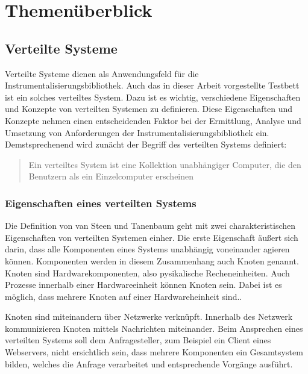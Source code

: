 %

\chapter{Themenüberblick}

\section{Verteilte Systeme}

Verteilte Systeme dienen als Anwendungsfeld für die Instrumentalisierungsbibliothek. Auch das in dieser Arbeit vorgestellte Testbett ist ein solches verteiltes System. Dazu ist es wichtig,  verschiedene Eigenschaften und Konzepte von verteilten Systemen zu definieren. Diese Eigenschaften und Konzepte nehmen einen entscheidenden Faktor bei der Ermittlung, Analyse und Umsetzung von Anforderungen der Instrumentalisierungsbibliothek ein. Demstsprechenend wird zunächt der Begriff des verteilten Systems definiert:

\begin{quote}
	Ein verteiltes System ist eine Kollektion unabhängiger Computer, die den Benutzern als ein Einzelcomputer erscheinen 
\end{quote}

\subsection{Eigenschaften eines verteilten Systems}
	Die Definition von van Steen und Tanenbaum geht mit zwei charakteristischen Eigenschaften von verteilten Systemen einher. Die erste Eigenschaft äußert sich darin, dass alle Komponenten eines Systems unabhängig voneinander agieren können. Komponenten werden in diesem Zusammenhang auch Knoten genannt. Knoten sind Hardwarekomponenten, also pysikalische Recheneinheiten. Auch Prozesse innerhalb einer Hardwareeinheit können Knoten sein. Dabei ist es möglich, dass mehrere Knoten auf einer Hardwareheinheit sind..

	Knoten sind miteinandern über Netzwerke verknüpft. Innerhalb des Netzwerk kommunizieren Knoten mittels Nachrichten miteinander. Beim Ansprechen eines verteilten Systems soll dem Anfragesteller, zum Beispiel ein Client eines Webservers, nicht ersichtlich sein, dass mehrere Komponenten ein Gesamtsystem bilden, welches die Anfrage verarbeitet und entsprechende Vorgänge ausführt. 
